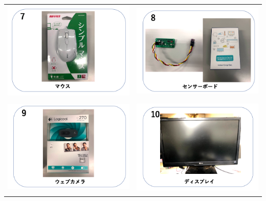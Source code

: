 \begin{tabular}{cc}

  \includegraphics[width=6.488cm,height=4.697cm]{text01-img/textbook-img003.png}
   &
  \includegraphics[width=6.488cm,height=4.697cm]{text01-img/textbook-img004.png}\\

  \includegraphics[width=6.488cm,height=4.697cm]{text01-img/textbook-img002.png}
   &
  \includegraphics[width=6.488cm,height=4.697cm]{text01-img/textbook-img001.png} \\
\end{tabular}

% 
% 
